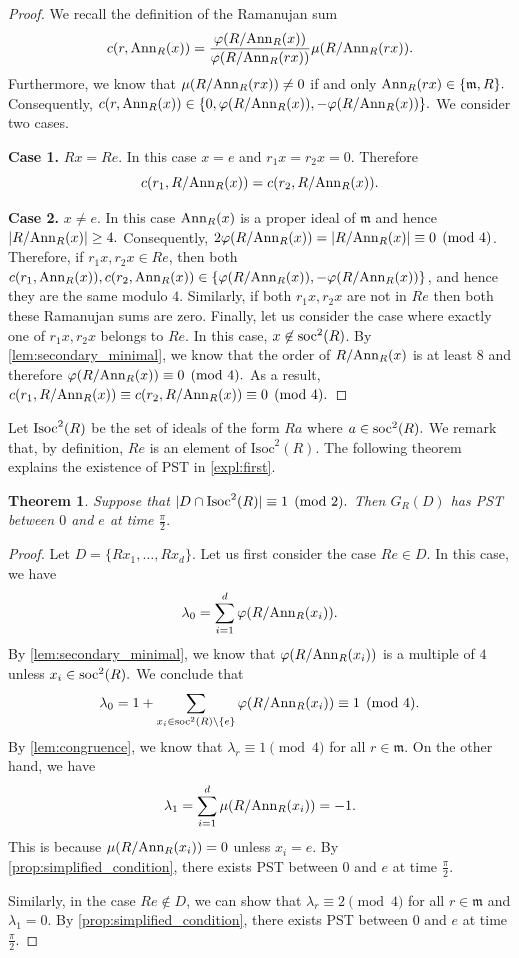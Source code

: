 \documentclass[12pt, a4paper]{amsart}
\newtheorem{thm}{Theorem}[section]
\theoremstyle{definition}
\newcommand{\Ann}{{\rm Ann}}
\numberwithin{equation}{section}
\newcommand{\soc}{{{\rm soc}}}
\newcommand{\Isoc}{{{\rm Isoc}}}
\begin{document}
\begin{proof}
We recall the definition of the Ramanujan sum  
\[ c(r, \Ann_{R}(x)) = \dfrac{\varphi(R/\Ann_{R}(x))}{\varphi(R/\Ann_{R}(rx))} \mu(R/\Ann_{R}(rx)). \] 
Furthermore, we know that $\mu(R/\Ann_{R}(rx)) \neq 0$ if and only $\Ann_{R}(rx) \in \{\mathfrak{m}, R \}.$ Consequently, $c(r, \Ann_{R}(x)) \in \{0, \varphi(R/\Ann_{R}(x)), - \varphi(R/\Ann_{R}(x)) \}.$ We consider two cases. 

\noindent \textbf{Case 1.} $Rx=Re$. In this case $x=e$ and $r_1x=r_2x=0.$ Therefore 
\[ c(r_1, R/\Ann_{R}(x)) = c(r_2, R/\Ann_{R}(x)). \]  

\noindent\textbf{Case 2.} $x \neq e.$ In this case $\Ann_{R}(x)$ is a proper ideal of $\mathfrak{m}$ and hence $|R/\Ann_{R}(x)| \geq 4.$ Consequently, $2\varphi(R/\Ann_{R}(x)) = |R/\Ann_{R}(x)| \equiv 0 \pmod{4}$. Therefore, if $r_1x, r_2x \in Re$, then both $c(r_1, \Ann_{R}(x)), c(r_2, \Ann_{R}(x)) \in \{ \varphi(R/\Ann_{R}(x)), - \varphi(R/\Ann_{R}(x)) \}$, and hence they are the same modulo $4.$ Similarly, if both $r_1x, r_2x$ are not in $Re$ then both these Ramanujan sums are zero. Finally, let us consider the case where exactly one of $r_1x, r_2x$ belongs to $Re.$ In this case, $x \not \in \soc^2(R)$. By \cref{lem:secondary_minimal}, we know that the order of $R/\Ann_{R}(x)$ is at least $8$ and therefore $\varphi(R/\Ann_{R}(x)) \equiv 0 \pmod{4}.$ As a result, $c(r_1, R/\Ann_{R}(x)) \equiv c(r_2, R/\Ann_{R}(x)) \equiv 0 \pmod{4}.$ 
\end{proof}

Let $\Isoc^2(R)$ be the set of ideals of the form $Ra$ where $a \in \soc^2(R).$ We remark that, by definition, $Re$ is an element of $\text{Isoc}^2(R).$ The following theorem explains the existence of PST in \cref{expl:first}. 

\begin{thm} \label{thm:local}
    Suppose that $|D \cap \Isoc^2(R)| \equiv 1 \pmod{2}.$ Then $G_{R}(D)$ has PST between $0$ and $e$ at time $\frac{\pi}{2}.$
\end{thm}

\begin{proof}
Let $D= \{Rx_1, \ldots, Rx_d \}$.  Let us first consider the case $Re \in D.$ In this case, we have 
\[ \lambda_0 = \sum_{i=1}^d \varphi(R/\Ann_{R}(x_i)). \]
By \cref{lem:secondary_minimal}, we know that $\varphi(R/\Ann_{R}(x_i))$ is a multiple of $4$ unless $x_i \in \soc^2(R).$ We conclude that 
\[ \lambda_0 = 1 +  \sum_{x_i \in \soc^2(R) \setminus \{e \}} \varphi(R/\Ann_{R}(x_i)) \equiv 1 \pmod{4}. \]
By \cref{lem:congruence}, we know that $\lambda_r \equiv 1 \pmod{4}$ for all $r \in \mathfrak{m}$. On the other hand, we have 
\[ \lambda_1 = \sum_{i=1}^d \mu(R/\Ann_{R}(x_i)) = -1. \]
This is because $\mu(R/\Ann_{R}(x_i))=0$ unless $x_i=e.$ By \cref{prop:simplified_condition}, there exists PST between $0$ and $e$ at time $\frac{\pi}{2}.$


Similarly, in the case $Re \not \in D$, we can show that $\lambda_r \equiv 2 \pmod{4}$ for all $r \in \mathfrak{m}$ and $\lambda_1 = 0.$ By \cref{prop:simplified_condition}, there exists PST between $0$ and $e$ at time $\frac{\pi}{2}.$
\end{proof}
\end{document}
